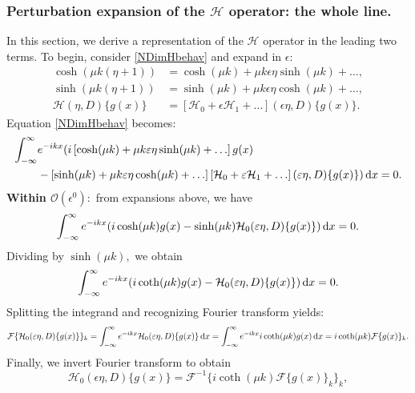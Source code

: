 \documentclass[10pt,reqno,oneside,a4paper]{article}
\begin{document}
\subsubsection{Perturbation expansion of the $\mathcal{H}$ operator: the whole line.}
In this section, we derive a representation of the $\mathcal{H}$ operator in the leading two terms. To begin, consider \eqref{NDimHbehav} and expand in $\epsilon:$
\begin{align*}
\cosh(\mu k(\eta+1)) &= \cosh(\mu k) + \mu k \epsilon \eta \sinh(\mu k) + \ldots, \\
\sinh(\mu k(\eta+1)) &= \sinh(\mu k) + \mu k \epsilon \eta \cosh(\mu k) + \ldots, \\
\mathcal{H}( \eta, D)\{ g(x) \} &= \left[\mathcal{H}_0 + \epsilon \mathcal{H}_1 + \ldots \right]( \epsilon\eta, D)\{ g(x) \}.
\end{align*}
Equation \eqref{NDimHbehav} becomes:
\begin{align*}
\int_{-\infty}^{\infty} &e^{-ikx}( i \left[ \cosh(\mu k) + \mu k \varepsilon \eta \sinh(\mu k) + \ldots \right] g(x) \\
&- \left[ \sinh(\mu k) + \mu k \varepsilon \eta \cosh(\mu k) + \ldots\right] \left[ \mathcal{H}_0 + \varepsilon \mathcal{H}_1 + \ldots \right]( \varepsilon \eta, D)\{ g(x) \}) \,\mathrm{d} x = 0.
\end{align*}
\textbf{Within $\mathcal{O}(\epsilon^0):$} from expansions above, we have 
\begin{equation*}
\int_{-\infty}^{\infty} e^{-ikx}( i  \cosh(\mu k) g(x) - \sinh(\mu k) \mathcal{H}_0( \varepsilon \eta, D)\{ g(x) \}) \,\mathrm{d} x = 0.
\end{equation*}
Dividing by $\sinh(\mu k),$ we obtain 
\begin{equation*}
\int_{-\infty}^{\infty} e^{-ikx}( i  \coth(\mu k) g(x) - \mathcal{H}_0( \varepsilon \eta, D)\{ g(x) \}) \,\mathrm{d} x = 0.
\end{equation*}
Splitting the integrand and recognizing Fourier transform yields:
\begin{equation*}
\mathcal{F}\{\mathcal{H}_0( \varepsilon \eta, D)\{ g(x) \}\}_k= \int_{-\infty}^{\infty} e^{-ikx}\mathcal{H}_0( \varepsilon \eta, D)\{ g(x) \} \,\mathrm{d} x = \int_{-\infty}^{\infty} e^{-ikx} i \coth(\mu k) g(x) \,\mathrm{d} x = i \coth(\mu k) \mathcal{F}\{g(x)\}_k.
\end{equation*}
Finally, we invert Fourier transform to obtain 
\begin{equation*}
\mathcal{H}_0( \epsilon \eta, D)\{ g(x) \} =\mathcal{F}^{-1}\{i \coth(\mu k) \mathcal{F}\{g(x)\}_k \}_k,
\end{equation*}
\end{document}
